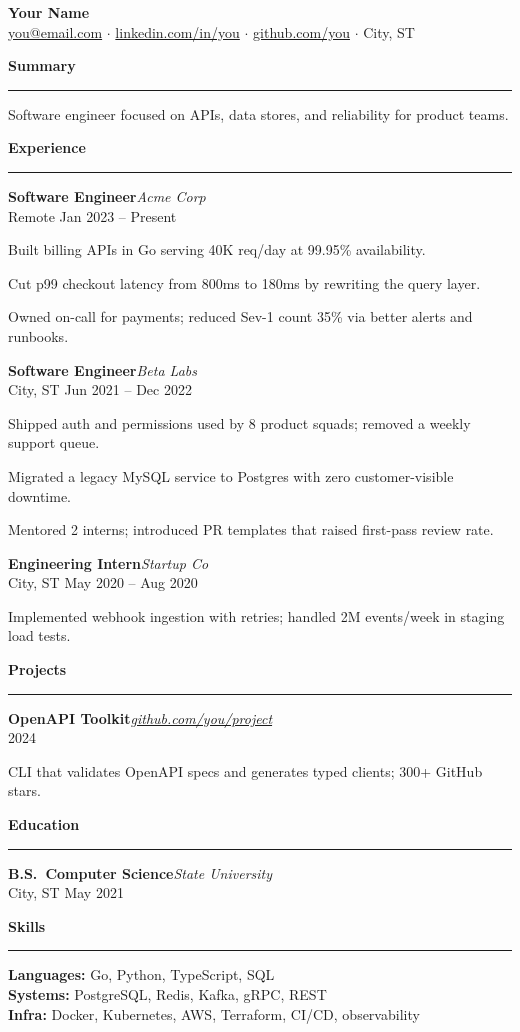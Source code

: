 \documentclass[11pt,letterpaper]{article}
\newcommand{\resumesection}[1]{%
  \par\vspace{0.65em}%
  {\large\bfseries\color{accent}#1}\par
  \vspace{-0.35em}%
  \textcolor{accent}{\rule{\textwidth}{0.55pt}}\par
  \vspace{0.3em}%
}
\newcommand{\role}[3]{%
  \noindent\textbf{#1}\hfill\textit{#2}\\
  \textcolor{muted}{\small #3}\par\vspace{0.12em}
}
\newenvironment{resumeitemize}{%
  \begin{list}{\textbullet}{%
    \setlength{\leftmargin}{1.1em}%
    \setlength{\itemsep}{0.12em}%
    \setlength{\parsep}{0pt}%
    \setlength{\topsep}{0.15em}%
    \setlength{\partopsep}{0pt}%
  }%
}{\end{list}}
\newcommand{\entrygap}{\vspace{0.45em}}
\begin{document}
\begin{center}
  {\LARGE\bfseries Your Name}\\[0.3em]
  {\small
    \href{mailto:you@email.com}{you@email.com}
    $\cdot$ \href{https://linkedin.com/in/you}{linkedin.com/in/you}
    $\cdot$ \href{https://github.com/you}{github.com/you}
    $\cdot$ City, ST
  }
\end{center}

\resumesection{Summary}
Software engineer focused on APIs, data stores, and reliability for product teams.

\resumesection{Experience}
\role{Software Engineer}{Acme Corp}{Remote \quad Jan 2023 -- Present}
\begin{resumeitemize}
  \item Built billing APIs in Go serving 40K req/day at 99.95\% availability.
  \item Cut p99 checkout latency from 800ms to 180ms by rewriting the query layer.
  \item Owned on-call for payments; reduced Sev-1 count 35\% via better alerts and runbooks.
\end{resumeitemize}
\entrygap
\role{Software Engineer}{Beta Labs}{City, ST \quad Jun 2021 -- Dec 2022}
\begin{resumeitemize}
  \item Shipped auth and permissions used by 8 product squads; removed a weekly support queue.
  \item Migrated a legacy MySQL service to Postgres with zero customer-visible downtime.
  \item Mentored 2 interns; introduced PR templates that raised first-pass review rate.
\end{resumeitemize}
\entrygap
\role{Engineering Intern}{Startup Co}{City, ST \quad May 2020 -- Aug 2020}
\begin{resumeitemize}
  \item Implemented webhook ingestion with retries; handled 2M events/week in staging load tests.
\end{resumeitemize}

\resumesection{Projects}
\role{OpenAPI Toolkit}{\href{https://github.com/you/project}{github.com/you/project}}{2024}
\begin{resumeitemize}
  \item CLI that validates OpenAPI specs and generates typed clients; 300+ GitHub stars.
\end{resumeitemize}

\resumesection{Education}
\role{B.S.\ Computer Science}{State University}{City, ST \quad May 2021}

\resumesection{Skills}
\noindent\textbf{Languages:} Go, Python, TypeScript, SQL\\
\textbf{Systems:} PostgreSQL, Redis, Kafka, gRPC, REST\\
\textbf{Infra:} Docker, Kubernetes, AWS, Terraform, CI/CD, observability
\end{document}
